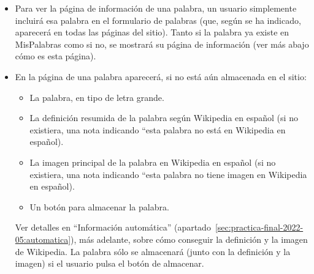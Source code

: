 \begin{itemize}
\item Para ver la página de información de una palabra, un usuario simplemente incluirá esa palabra en el formulario de palabras (que, según se ha indicado, aparecerá en todas las páginas del sitio). Tanto si la palabra ya existe en MisPalabras como si no, se mostrará su página de información (ver más abajo cómo es esta página).

\item En la página de una palabra aparecerá, si no está aún almacenada en el sitio:
  \begin{itemize}
  \item La palabra, en tipo de letra grande.
  \item La definición resumida de la palabra según Wikipedia en español (si no existiera, una nota indicando ``esta palabra no está en Wikipedia en español).
  \item La imagen principal de la palabra en Wikipedia en español (si no existiera, una nota indicando ``esta palabra no tiene imagen en Wikipedia en español).
  \item Un botón para almacenar la palabra.
  \end{itemize}

  Ver detalles en ``Información automática'' (apartado~\ref{sec:practica-final-2022-05:automatica}), más adelante, sobre cómo conseguir la definición y la imagen de Wikipedia. La palabra sólo se almacenará (junto con la definición y la imagen) si el usuario pulsa el botón de almacenar.


\end{itemize}

